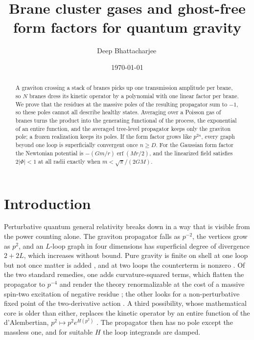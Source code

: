 \documentclass[aps,prd,10pt,twocolumn,superscriptaddress,nofootinbib,floatfix,longbibliography,showpacs,showkeys]{revtex4-2}
\theoremstyle{plain}
\theoremstyle{definition}
\theoremstyle{remark}
\newcommand{\erf}{\operatorname{erf}}
\begin{document}
\title{Brane cluster gases and ghost-free form factors for quantum gravity}

\author{Deep Bhattacharjee\,}

\date{\today}

\begin{abstract}
A graviton crossing a stack of branes picks up one transmission amplitude per brane, so $N$ branes dress its kinetic operator by a polynomial with one linear factor per brane. We prove that the residues at the massive poles of the resulting propagator sum to $-1$, so these poles cannot all describe healthy states. Averaging over a Poisson gas of branes turns the product into the generating functional of the process, the exponential of an entire function, and the averaged tree-level propagator keeps only the graviton pole; a frozen realization keeps its poles. If the form factor grows like $p^{2n}$, every graph beyond one loop is superficially convergent once $n\ge D$. For the Gaussian form factor the Newtonian potential is $-(Gm/r)\erf(Mr/2)$, and the linearized field satisfies $2|\Phi|<1$ at all radii exactly when $m<\sqrt{\pi}/(2GM)$.
\end{abstract}

\makeatletter{}\makeatother
{}

\maketitle

\section{Introduction}
\label{sec:intro}

Perturbative quantum general relativity breaks down in a way that is visible from the power counting alone. The graviton propagator falls as $p^{-2}$, the vertices grow as $p^{2}$, and an $L$-loop graph in four dimensions has superficial degree of divergence $2+2L$, which increases without bound. Pure gravity is finite on shell at one loop but not once matter is added \cite{tHooftVeltman1974}, and at two loops the counterterm is nonzero \cite{GoroffSagnotti1986}. Of the two standard remedies, one adds curvature-squared terms, which flatten the propagator to $p^{-4}$ and render the theory renormalizable at the cost of a massive spin-two excitation of negative residue \cite{Stelle1977}; the other looks for a non-perturbative fixed point of the two-derivative action \cite{Weinberg1979,Reuter1998}. A third possibility, whose mathematical core is older than either, replaces the kinetic operator by an entire function of the d'Alembertian, $p^2\mapsto p^2e^{H(p^2)}$ \cite{Efimov1967,Krasnikov1987,Kuzmin1989,Tomboulis1997,BiswasMazumdarSiegel2006,BGKM2012,Modesto2012}. The propagator then has no pole except the massless one, and for suitable $H$ the loop integrands are damped.
\end{document}
